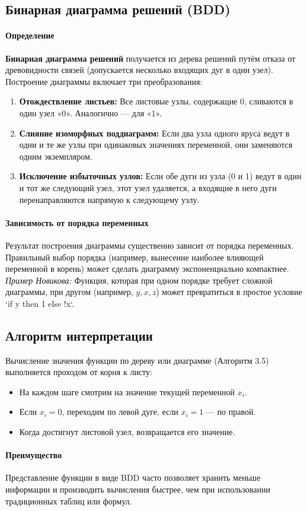 \subsection*{Бинарная диаграмма решений (BDD)}

\paragraph{Определение}
\textbf{Бинарная диаграмма решений} получается из дерева решений путём отказа от древовидности связей (допускается несколько входящих дуг в один узел). Построение диаграммы включает три преобразования:
\begin{enumerate}
    \item \textbf{Отождествление листьев:} Все листовые узлы, содержащие 0, сливаются в один узел «0». Аналогично — для «1».
    \item \textbf{Слияние изоморфных поддиаграмм:} Если два узла одного яруса ведут в одни и те же узлы при одинаковых значениях переменной, они заменяются одним экземпляром.
    \item \textbf{Исключение избыточных узлов:} Если обе дуги из узла (0 и 1) ведут в один и тот же следующий узел, этот узел удаляется, а входящие в него дуги перенаправляются напрямую к следующему узлу.
\end{enumerate}

\paragraph{Зависимость от порядка переменных}
Результат построения диаграммы существенно зависит от порядка переменных. Правильный выбор порядка (например, вынесение наиболее влияющей переменной в корень) может сделать диаграмму экспоненциально компактнее.
\textit{Пример Новикова:} Функция, которая при одном порядке требует сложной диаграммы, при другом (например, $y, x, z$) может превратиться в простое условие `if y then 1 else !x`.

\subsection*{Алгоритм интерпретации}

Вычисление значения функции по дереву или диаграмме (Алгоритм 3.5) выполняется проходом от корня к листу:
\begin{itemize}
    \item На каждом шаге смотрим на значение текущей переменной $x_i$.
    \item Если $x_i = 0$, переходим по левой дуге, если $x_i = 1$ — по правой.
    \item Когда достигнут листовой узел, возвращается его значение.
\end{itemize}

\paragraph{Преимущество}
Представление функции в виде BDD часто позволяет хранить меньше информации и производить вычисления быстрее, чем при использовании традиционных таблиц или формул.
